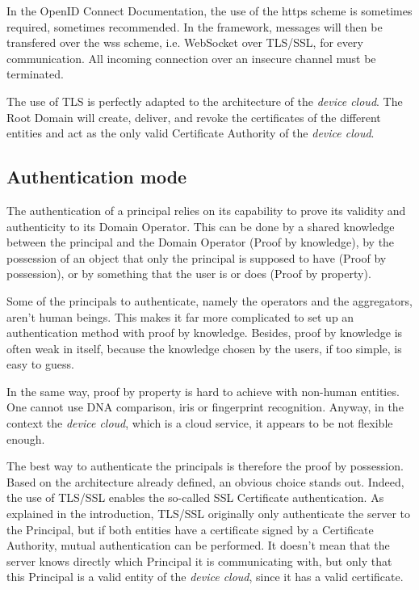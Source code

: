 In the OpenID Connect Documentation, the use of the https scheme is sometimes required, sometimes recommended. In the framework, messages will then be transfered over the wss scheme, i.e. WebSocket over TLS/SSL, for every communication. All incoming connection over an insecure channel must be terminated.

The use of TLS is perfectly adapted to the architecture of the \emph{device cloud}. The Root Domain will create, deliver, and revoke the certificates of the different entities and act as the only valid Certificate Authority of the \emph{device cloud}.

\subsection{Authentication mode}
\label{sec:03_auth_mode}

The authentication of a principal relies on its capability to prove its validity and authenticity to its Domain Operator. This can be done by a shared knowledge between the principal and the Domain Operator (Proof by knowledge), by the possession of an object that only the principal is supposed to have (Proof by possession), or by something that the user is or does (Proof by property).

Some of the principals to authenticate, namely the operators and the aggregators, aren't human beings. This makes it far more complicated to set up an authentication method with proof by knowledge. Besides, proof by knowledge is often weak in itself, because the knowledge chosen by the users, if too simple, is easy to guess.

In the same way, proof by property is hard to achieve with non-human entities. One cannot use DNA comparison, iris or fingerprint recognition. Anyway, in the context the \emph{device cloud}, which is a cloud service, it appears to be not flexible enough.

The best way to authenticate the principals is therefore the proof by possession. Based on the architecture already defined, an obvious choice stands out. Indeed, the use of TLS/SSL enables the so-called SSL Certificate authentication. As explained in the introduction, TLS/SSL originally only authenticate the server to the Principal, but if both entities have a certificate signed by a Certificate Authority, mutual authentication can be performed. It doesn't mean that the server knows directly which Principal it is communicating with, but only that this Principal is a valid entity of the \emph{device cloud}, since it has a valid certificate.

